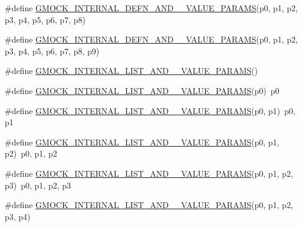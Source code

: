 \begin{DoxyCompactItemize}
\#define \mbox{\hyperlink{_obj__test_2lib_2googletest-release-1_88_81_2googlemock_2include_2gmock_2gmock-generated-actions_8h_a9565bbd3c2624487ccb71f325fd96596}{G\+M\+O\+C\+K\+\_\+\+I\+N\+T\+E\+R\+N\+A\+L\+\_\+\+D\+E\+F\+N\+\_\+\+A\+N\+D\+\_\+\_\+\+V\+A\+L\+U\+E\+\_\+\+P\+A\+R\+A\+MS}}(p0,  p1,  p2,  p3,  p4,  p5,  p6,  p7,  p8)
\item 
\#define \mbox{\hyperlink{_obj__test_2lib_2googletest-release-1_88_81_2googlemock_2include_2gmock_2gmock-generated-actions_8h_aea3f6f518db8ecc3b63341f38a7c4eaf}{G\+M\+O\+C\+K\+\_\+\+I\+N\+T\+E\+R\+N\+A\+L\+\_\+\+D\+E\+F\+N\+\_\+\+A\+N\+D\+\_\+\_\+\+V\+A\+L\+U\+E\+\_\+\+P\+A\+R\+A\+MS}}(p0,  p1,  p2,  p3,  p4,  p5,  p6,  p7,  p8,  p9)
\item 
\#define \mbox{\hyperlink{_obj__test_2lib_2googletest-release-1_88_81_2googlemock_2include_2gmock_2gmock-generated-actions_8h_a2dbeccb9f6d632f5e7e2c1421cd549aa}{G\+M\+O\+C\+K\+\_\+\+I\+N\+T\+E\+R\+N\+A\+L\+\_\+\+L\+I\+S\+T\+\_\+\+A\+N\+D\+\_\+\_\+\+V\+A\+L\+U\+E\+\_\+\+P\+A\+R\+A\+MS}}()
\item 
\#define \mbox{\hyperlink{_obj__test_2lib_2googletest-release-1_88_81_2googlemock_2include_2gmock_2gmock-generated-actions_8h_a12895511e72c47c78850542b68fe83d4}{G\+M\+O\+C\+K\+\_\+\+I\+N\+T\+E\+R\+N\+A\+L\+\_\+\+L\+I\+S\+T\+\_\+\+A\+N\+D\+\_\+\_\+\+V\+A\+L\+U\+E\+\_\+\+P\+A\+R\+A\+MS}}(p0)~p0
\item 
\#define \mbox{\hyperlink{_obj__test_2lib_2googletest-release-1_88_81_2googlemock_2include_2gmock_2gmock-generated-actions_8h_ac0efec20319ea66c5508b6e5ad42c357}{G\+M\+O\+C\+K\+\_\+\+I\+N\+T\+E\+R\+N\+A\+L\+\_\+\+L\+I\+S\+T\+\_\+\+A\+N\+D\+\_\+\_\+\+V\+A\+L\+U\+E\+\_\+\+P\+A\+R\+A\+MS}}(p0,  p1)~p0, p1
\item 
\#define \mbox{\hyperlink{_obj__test_2lib_2googletest-release-1_88_81_2googlemock_2include_2gmock_2gmock-generated-actions_8h_a10f92233f148b19f341e1a17267107d3}{G\+M\+O\+C\+K\+\_\+\+I\+N\+T\+E\+R\+N\+A\+L\+\_\+\+L\+I\+S\+T\+\_\+\+A\+N\+D\+\_\+\_\+\+V\+A\+L\+U\+E\+\_\+\+P\+A\+R\+A\+MS}}(p0,  p1,  p2)~p0, p1, p2
\item 
\#define \mbox{\hyperlink{_obj__test_2lib_2googletest-release-1_88_81_2googlemock_2include_2gmock_2gmock-generated-actions_8h_a8df889711a5f99ed76736a2bc5030cf2}{G\+M\+O\+C\+K\+\_\+\+I\+N\+T\+E\+R\+N\+A\+L\+\_\+\+L\+I\+S\+T\+\_\+\+A\+N\+D\+\_\+\_\+\+V\+A\+L\+U\+E\+\_\+\+P\+A\+R\+A\+MS}}(p0,  p1,  p2,  p3)~p0, p1, p2, p3
\item 
\#define \mbox{\hyperlink{_obj__test_2lib_2googletest-release-1_88_81_2googlemock_2include_2gmock_2gmock-generated-actions_8h_a4bfd52ebc75b6da1a84e5a59e12995fe}{G\+M\+O\+C\+K\+\_\+\+I\+N\+T\+E\+R\+N\+A\+L\+\_\+\+L\+I\+S\+T\+\_\+\+A\+N\+D\+\_\+\_\+\+V\+A\+L\+U\+E\+\_\+\+P\+A\+R\+A\+MS}}(p0,  p1,  p2,  p3,  p4)

\end{DoxyCompactItemize}
